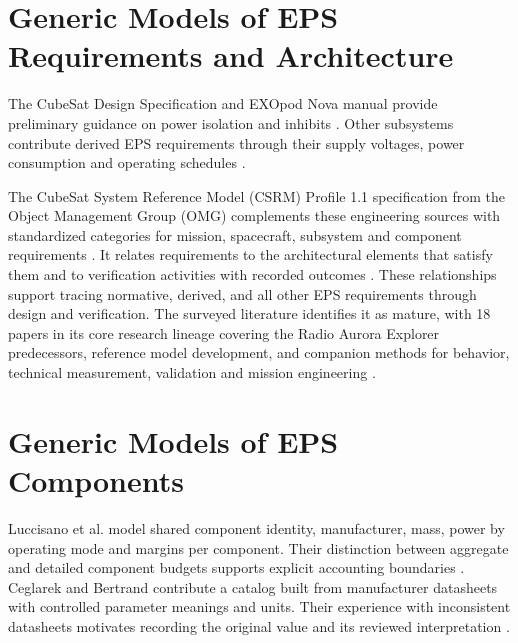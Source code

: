 \section{Generic Models of EPS Requirements and Architecture}
The CubeSat Design Specification and EXOpod Nova manual provide preliminary guidance on power isolation and inhibits \citep{calpoly2022cds,exolaunch2024exopodnova}.
Other subsystems contribute derived EPS requirements through their supply voltages, power consumption and operating schedules \citep[Secs.~2--4]{handpicked-0003}\citep[Sec.~2]{review-0289}.

The CubeSat System Reference Model (CSRM) Profile 1.1 specification from the Object Management Group (OMG) complements these engineering sources with standardized categories for mission, spacecraft, subsystem and component requirements \citep[Sec.~6.1]{omg2025csrm}.
It relates requirements to the architectural elements that satisfy them and to verification activities with recorded outcomes \citep[Secs.~6.3--6.4]{omg2025csrm}.
These relationships support tracing normative, derived, and all other EPS requirements through design and verification.
The surveyed literature identifies it as mature, with 18 papers in its core research lineage covering the Radio Aurora Explorer predecessors, reference model development, and companion methods for behavior, technical measurement, validation and mission engineering \citep{review-1646,review-1621,review-1554,review-1563,review-1494,review-1487,review-1451,review-1446,kaslow2017status3,kaslow2017behaviors,kaslow2018verification,review-1288,kaslow2018status4,kaslow2019csrm,kaslow2020csrm,review-1051,kaslow2022mission,rudder2026metamodel}.

\section{Generic Models of EPS Components}
Luccisano et al. model shared component identity, manufacturer, mass, power by operating mode and margins per component. Their distinction between aggregate and detailed component budgets supports explicit accounting boundaries \citep[Secs.~3.1--3.2]{luccisano2024formalization}. Ceglarek and Bertrand contribute a catalog built from manufacturer datasheets with controlled parameter meanings and units. Their experience with inconsistent datasheets motivates recording the original value and its reviewed interpretation \citep[Sec.~3]{review-0257}.

